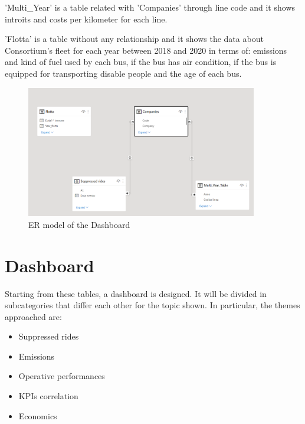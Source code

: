 'Multi\_Year' is a table related with 'Companies' through line code and it shows introits and costs per kilometer for each line. 

'Flotta' is a table without any relationship and it shows the data about Consortium's fleet for each year between 2018 and 2020 in terms of: emissions and kind of fuel used by each bus, if the bus has air condition, if the bus is equipped for transporting disable people and the age of each bus.


\begin{figure}[h]
    \centering
    \includegraphics[width=0.9\textwidth]{Images/traditional_dashboard/ER_model.png}
    \caption{ER model of the Dashboard}
    \label{fig:ER}
\end{figure}
\section{Dashboard}

Starting from these tables, a dashboard is designed. It will be divided in subcategories that differ each other for the topic shown. In particular, the themes approached are:
\begin{itemize}
\item Suppressed rides
\item Emissions
\item Operative performances
\item KPIs correlation
\item Economics
\end{itemize}
